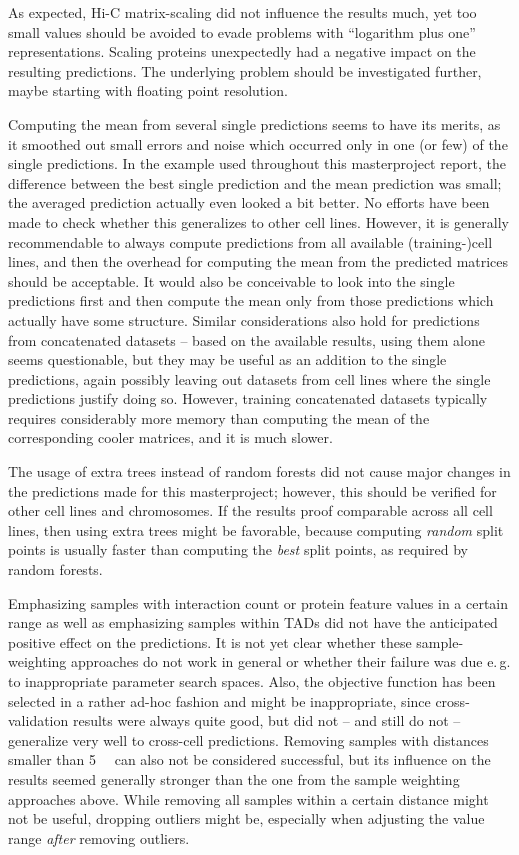 As expected, Hi-C matrix-scaling did not influence the results much,
yet too small values should be avoided to evade problems with ``logarithm plus one'' representations.
Scaling proteins unexpectedly had a negative impact on the resulting predictions.
The underlying problem should be investigated further, maybe starting with floating point resolution.

Computing the mean from several single predictions seems to have its merits, 
as it smoothed out small errors and noise which occurred only in one (or few) of the single predictions.
In the example used throughout this masterproject report, the difference between the best single
prediction and the mean prediction was small; the averaged prediction actually even looked a bit better.
No efforts have been made to check whether this generalizes to other cell lines.
However, it is generally recommendable to always compute predictions from all available (training-)cell lines,
and then the overhead for computing the mean from the predicted matrices should be acceptable.
It would also be conceivable to look into the single predictions first and then compute the mean only
from those predictions which actually have some structure.
Similar considerations also hold for predictions from concatenated datasets -- based on the available results,
using them alone seems questionable, but they may be useful as an addition to the single predictions, again
possibly leaving out datasets from cell lines where the single predictions justify doing so.
However, training concatenated datasets typically requires considerably more memory than computing the
mean of the corresponding cooler matrices, and it is much slower.

The usage of extra trees instead of random forests did not cause major changes in the predictions made 
for this masterproject; however, this should be verified for other cell lines and chromosomes.
If the results proof comparable across all cell lines, then using extra trees might be favorable,
because computing \emph{random} split points is usually faster than computing the \emph{best} split points,
as required by random forests.

Emphasizing samples with interaction count or protein feature values in a certain range as
well as emphasizing samples within TADs did not have the anticipated positive effect on the predictions.
It is not yet clear whether these sample-weighting approaches do not work in general or whether 
their failure was due e.\,g. to inappropriate parameter search spaces. 
Also, the objective function has been selected in a rather ad-hoc fashion and might be inappropriate, 
since cross-validation results were always quite good, 
but did not -- and still do not -- generalize very well to cross-cell predictions.
Removing samples with distances smaller than \SI{5}{\kilo\bp} can also not be considered successful,
but its influence on the results seemed generally stronger than the one from the sample weighting
approaches above.
While removing all samples within a certain distance might not be useful, 
dropping outliers might be, especially when adjusting the value range \emph{after} removing outliers.

